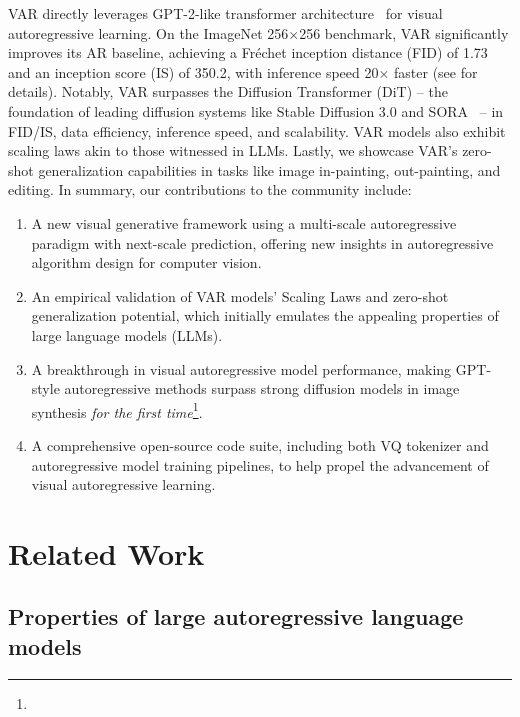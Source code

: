 VAR directly leverages GPT-2-like transformer architecture~\cite{gpt2} for visual autoregressive learning.
On the ImageNet 256$\times$256 benchmark, VAR significantly improves its AR baseline, achieving a Fréchet inception distance (FID) of 1.73 and an inception score (IS) of 350.2, with inference speed 20$\times$ faster (see  for details).
Notably, VAR surpasses the Diffusion Transformer (DiT) -- the foundation of leading diffusion systems like Stable Diffusion 3.0 and SORA~\cite{stable-diffusion3,sora} -- in FID/IS, data efficiency, inference speed, and scalability.
VAR models also exhibit scaling laws akin to those witnessed in LLMs.
Lastly, we showcase VAR's zero-shot generalization capabilities in tasks like image in-painting, out-painting, and editing.
In summary, our contributions to the community include:

\begin{enumerate}[topsep=3.5pt,itemsep=3pt,leftmargin=20pt]
\item A new visual generative framework using a multi-scale autoregressive paradigm with next-scale prediction, offering new insights in autoregressive algorithm design for computer vision.
\item An empirical validation of VAR models' Scaling Laws and zero-shot generalization potential, which initially emulates the appealing properties of large language models (LLMs).
\item A breakthrough in visual autoregressive model performance, making GPT-style autoregressive methods surpass strong diffusion models in image synthesis \textit{for the first time}\footnote{}.
\item A comprehensive open-source code suite, including both VQ tokenizer and autoregressive model training pipelines, to help propel the advancement of visual autoregressive learning.
\end{enumerate}

\vspace{-2pt}
\section{Related Work} \label{sec:related}
\vspace{-2pt}
\vspace{-2pt}
\subsection{Properties of large autoregressive language models}
\vspace{-2pt}

